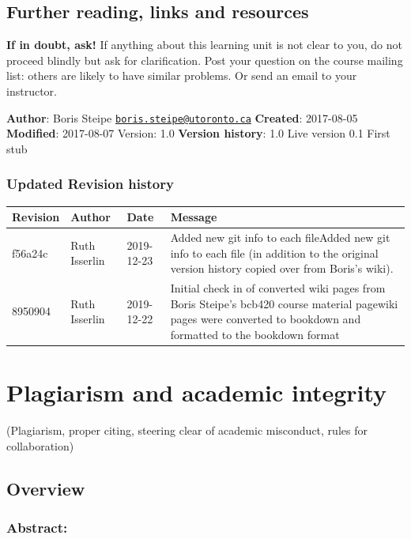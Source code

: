\documentclass[]{book}
\let\BeginKnitrBlock\begin \let\EndKnitrBlock\end
\begin{document}
\section{Further reading, links and
resources}\label{further-reading-links-and-resources-2}

\textbf{If in doubt, ask!} If anything about this learning unit is not
clear to you, do not proceed blindly but ask for clarification. Post
your question on the course mailing list: others are likely to have
similar problems. Or send an email to your instructor.

\BeginKnitrBlock{rmd-original-history}
\textbf{Author}: Boris Steipe
\href{mailto:boris.steipe@utoronto.ca}{\nolinkurl{boris.steipe@utoronto.ca}}
\textbf{Created}: 2017-08-05 \textbf{Modified}: 2017-08-07 Version: 1.0
\textbf{Version history}: 1.0 Live version 0.1 First stub
\EndKnitrBlock{rmd-original-history}

\subsection{Updated Revision history}\label{updated-revision-history-2}

\begin{tabular}{l|l|l|l}
\hline
Revision & Author & Date & Message\\
\hline
f56a24c & Ruth Isserlin & 2019-12-23 & Added new git info to each fileAdded new git info to each file (in addition to the original version history copied over from Boris's wiki).\\
\hline
8950904 & Ruth Isserlin & 2019-12-22 & Initial check in of converted wiki pages from Boris Steipe's bcb420 course material pagewiki pages were converted to bookdown and formatted to the bookdown format\\
\hline
\end{tabular}

\chapter{Plagiarism and academic integrity}\label{plagiarism}

(Plagiarism, proper citing, steering clear of academic misconduct, rules
for collaboration)

\section{Overview}\label{overview-3}

\subsection{Abstract:}\label{abstract-3}
\end{document}

